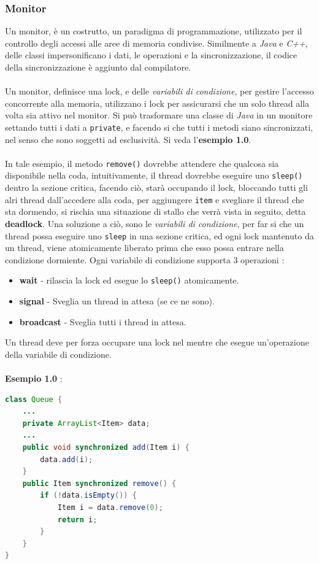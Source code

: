 \documentclass[12pt, letterpaper]{article}
\newcommand{\code}[1]{\colorbox{light-gray}{\texttt{#1}}}
\newcommand{\acc}{\\\hphantom{}\\}
\begin{document}
\subsubsection{Monitor}
Un monitor, è un costrutto, un paradigma di programmazione, utilizzato per il controllo degli accessi alle aree di 
memoria condivise. Similmente a \textit{Java} e \textit{C++}, delle classi impersonificano i dati, le operazioni e la 
sincronizzazione, il codice della sincronizzazione è aggiunto dal compilatore. \acc 
Un monitor, definisce una lock, e delle \textit{variabili di condizione}, per gestire l'accesso concorrente alla memoria, 
utilizzano i lock per assicurarsi che un solo thread alla volta sia attivo nel monitor. Si può trasformare una classe 
di \textit{Java} in un monitore settando tutti i dati a \code{private}, e facendo si che tutti i 
metodi siano sincronizzati, nel senso che sono soggetti ad esclusività.
Si veda l'\textbf{esempio 1.0}.\acc 
In tale esempio, il metodo \code{remove()} dovrebbe attendere che qualcosa sia disponibile nella coda, 
intuitivamente, il thread dovrebbe eseguire uno \code{sleep()} dentro la sezione critica, facendo ciò, 
starà occupando il lock, bloccando tutti gli alri thread dall'accedere alla coda, per aggiungere \code{item} e svegliare 
il thread che sta dormendo, si rischia una situazione di stallo che verrà vista in seguito, detta \textbf{deadlock}.
 Una soluzione a ciò, sono le \textit{variabili di condizione}, per far si che un thread possa 
 eseguire uno \code{sleep} in una sezione critica, ed ogni lock mantenuto da un thread, viene atomicamente liberato prima 
 che esso possa entrare nella condizione dormiente. Ogni variabile di condizione supporta 3 operazioni :\begin{itemize}
    \item \textbf{wait} - rilascia la lock ed esegue lo \code{sleep()} atomicamente. 
    \item \textbf{signal} - Sveglia un thread in attesa (se ce ne sono). 
    \item \textbf{broadcast} - Sveglia tutti i thread in attesa.
 \end{itemize}
 Un thread deve per forza occupare una lock nel mentre che esegue un'operazione della variabile di condizione. 
\acc \textbf{Esempio 1.0} :
\begin{lstlisting}[language=Java]
class Queue {
    ...
    private ArrayList<Item> data;
    ...
    public void synchronized add(Item i) {
        data.add(i);
    }
    public Item synchronized remove() {
        if (!data.isEmpty()) {
            Item i = data.remove(0);
            return i;
        }
    }
}
    
\end{lstlisting}
\end{document}
